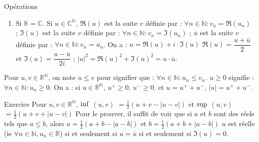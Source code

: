\documentclass[12pt,a4paper]{report}
\begin{document}
\begin{definition}{Opérations}{}
\begin{enumerate}
\item Si $\mathbb{K} = \mathbb{C}$. Si $u \in \mathbb{C}^\mathbb{N}$,
\newline $\Re(u)$ est la suite $v$ définie par : $\forall n \in \mathbb{N} : v_n = \Re(u_n)$ ;
\newline $\Im(u)$ est la suite $v$ définie par : $\forall n \in \mathbb{N} : v_n = \Im(u_n)$ ;
\newline $\overline{u}$ est la suite $v$ définie par : $\forall n \in \mathbb{N} : v_n = \overline{u_n}$.
\newline On a : 
\newline $u = \Re(u) + i\cdot  \Im(u)$
\newline $\Re(u) = \dfrac{u+ \overline{u}}{2}$ et $\Im(u) = \dfrac{u - \overline{u}}{2i}$ ;
\newline $\lvert u \rvert ^2 = \Re(u)^2 + \Im(u)^2 = u\cdot\overline{u}$.

\end{enumerate}
\end{definition}

\begin{remarque}
Pour $u,v \in \mathbb{R}^\mathbb{N}$, on note $u \leq v$ pour signifier que : $\forall n \in \mathbb{N} : u_n \leq v_n$.
\newline $u \geq 0$ signifie : $\forall n \in \mathbb{N} : u_n \geq 0$.
\newline On a : si $u \in \mathbb{R}^\mathbb{N}$, $ u^+ \geq 0$, $u^- \geq 0$, et $u = u^+ + u^-$, $\lvert u \rvert = u^+ + u^-$.
\end{remarque}


\begin{application}{Exercice}{}
Pour $u,v \in \mathbb{R}^\mathbb{N}$, $\rm{inf}$ $(u,v)$ $= \frac{1}{2} (u+v - \lvert u-v \rvert)$ et $\rm{sup}$ $(u,v)$ $= \frac{1}{2} (u+v + \lvert u-v \rvert)$
\newline Pour le prouver, il suffit de voir que si $a$ et $b$ sont des réels tels que $a \leq b$, alors \newline $a = \frac{1}{2} (a+b - \lvert a-b \rvert)$ et $b = \frac{1}{2} (a+b + \lvert a-b \rvert)$
\newline $u$ est réelle (ie $\forall n \in \mathbb{N}, u_n \in \mathbb{R}$) si et seulement si $u = \overline{u}$ si et seulement si $\Im(u)=0$.
\end{application}
\end{document}
